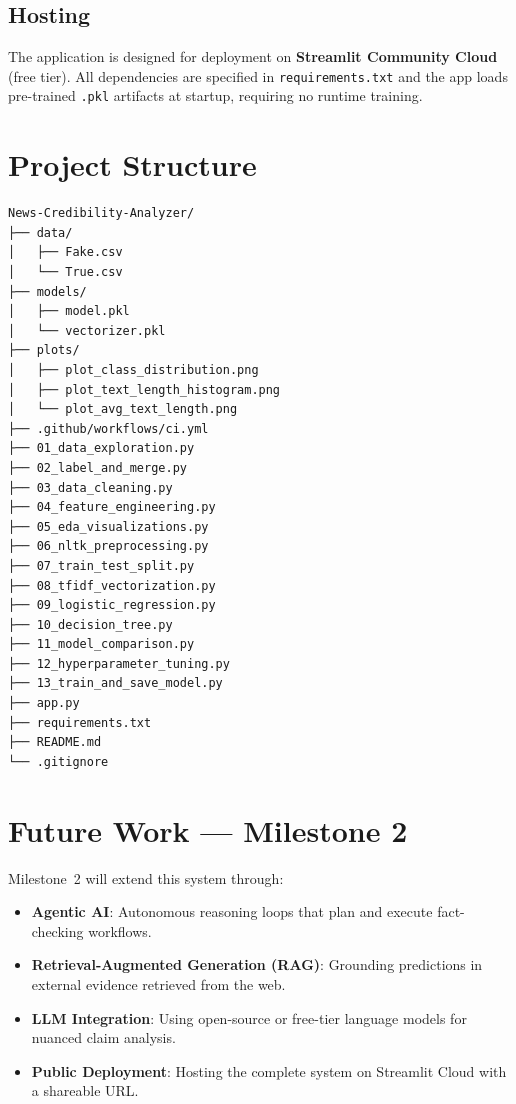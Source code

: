 \documentclass[12pt, a4paper]{article}
\begin{document}
\subsection{Hosting}
The application is designed for deployment on \textbf{Streamlit Community Cloud} (free tier). All dependencies are specified in \texttt{requirements.txt} and the app loads pre-trained \texttt{.pkl} artifacts at startup, requiring no runtime training.

\section{Project Structure}

\begin{verbatim}
News-Credibility-Analyzer/
├── data/
│   ├── Fake.csv
│   └── True.csv
├── models/
│   ├── model.pkl
│   └── vectorizer.pkl
├── plots/
│   ├── plot_class_distribution.png
│   ├── plot_text_length_histogram.png
│   └── plot_avg_text_length.png
├── .github/workflows/ci.yml
├── 01_data_exploration.py
├── 02_label_and_merge.py
├── 03_data_cleaning.py
├── 04_feature_engineering.py
├── 05_eda_visualizations.py
├── 06_nltk_preprocessing.py
├── 07_train_test_split.py
├── 08_tfidf_vectorization.py
├── 09_logistic_regression.py
├── 10_decision_tree.py
├── 11_model_comparison.py
├── 12_hyperparameter_tuning.py
├── 13_train_and_save_model.py
├── app.py
├── requirements.txt
├── README.md
└── .gitignore
\end{verbatim}

\section{Future Work — Milestone 2}

Milestone~2 will extend this system through:
\begin{itemize}[nosep]
    \item \textbf{Agentic AI}: Autonomous reasoning loops that plan and execute fact-checking workflows.
    \item \textbf{Retrieval-Augmented Generation (RAG)}: Grounding predictions in external evidence retrieved from the web.
    \item \textbf{LLM Integration}: Using open-source or free-tier language models for nuanced claim analysis.
    \item \textbf{Public Deployment}: Hosting the complete system on Streamlit Cloud with a shareable URL.
\end{itemize}
\end{document}
